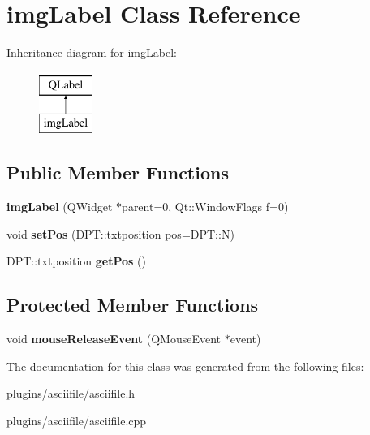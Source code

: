 \hypertarget{classimgLabel}{\section{img\-Label Class Reference}
\label{classimgLabel}
}
Inheritance diagram for img\-Label\-:\begin{figure}[H]
\begin{center}
\leavevmode
\includegraphics[height=2.000000cm]{classimgLabel}
\end{center}
\end{figure}
\subsection*{Public Member Functions}
\begin{DoxyCompactItemize}
\item 
\hypertarget{classimgLabel_a1c368a6a05355372267218426f6235af}{{\bfseries img\-Label} (Q\-Widget $\ast$parent=0, Qt\-::\-Window\-Flags f=0)}\label{classimgLabel_a1c368a6a05355372267218426f6235af}

\item 
\hypertarget{classimgLabel_a652b2382d7c5a25b338e6debaec0ad19}{void {\bfseries set\-Pos} (D\-P\-T\-::txtposition pos=D\-P\-T\-::\-N)}\label{classimgLabel_a652b2382d7c5a25b338e6debaec0ad19}

\item 
\hypertarget{classimgLabel_ada5668f175bec5a1892663ce0fde8dcb}{D\-P\-T\-::txtposition {\bfseries get\-Pos} ()}\label{classimgLabel_ada5668f175bec5a1892663ce0fde8dcb}

\end{DoxyCompactItemize}
\subsection*{Protected Member Functions}
\begin{DoxyCompactItemize}
\item 
\hypertarget{classimgLabel_a8d9aa6c82512282c87263b6e3bc075d0}{void {\bfseries mouse\-Release\-Event} (Q\-Mouse\-Event $\ast$event)}\label{classimgLabel_a8d9aa6c82512282c87263b6e3bc075d0}

\end{DoxyCompactItemize}


The documentation for this class was generated from the following files\-:\begin{DoxyCompactItemize}
\item 
plugins/asciifile/asciifile.\-h\item 
plugins/asciifile/asciifile.\-cpp\end{DoxyCompactItemize}

